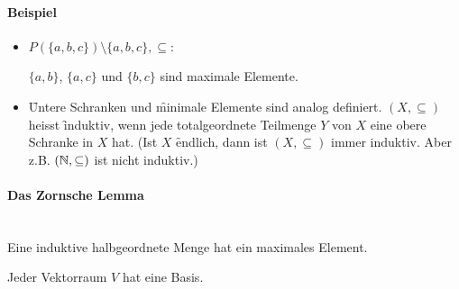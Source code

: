 \paragraph{Beispiel}
\begin{itemize}
\item $P(\{a, b, c\}) \setminus \{a, b, c\}, \subseteq$:
   \begin{center}
   \end{center}
$\{a, b\}$, $\{a, c\}$ und $\{b, c\}$ sind maximale Elemente. 
\item \f{Untere Schranken} und \f{minimale Elemente} sind analog definiert. $(X, \subseteq)$ heisst \f{induktiv}, wenn jede totalgeordnete Teilmenge $Y$ von $X$ eine obere Schranke in $X$ hat. (Ist $X$ \f{endlich}, dann ist $(X, \subseteq)$ immer induktiv. Aber z.B. $(\mathbb{N}, \subseteq)$ ist nicht induktiv.)
\end{itemize}

\paragraph{Das Zornsche Lemma} {\ \\}
Eine induktive halbgeordnete Menge hat ein maximales Element.

\begin{satz} %
Jeder Vektorraum $V$ hat eine Basis.
\end{satz}


